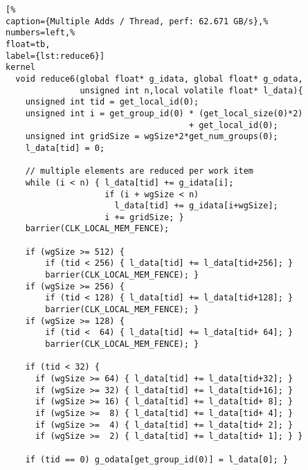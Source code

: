 \begin{lstlisting}[%                                                             
caption={Multiple Adds / Thread, perf: 62.671 GB/s},%
numbers=left,%
float=tb,
label={lst:reduce6}]
kernel
  void reduce6(global float* g_idata, global float* g_odata,
               unsigned int n,local volatile float* l_data){
    unsigned int tid = get_local_id(0);
    unsigned int i = get_group_id(0) * (get_local_size(0)*2)
                                     + get_local_id(0);
    unsigned int gridSize = wgSize*2*get_num_groups(0);
    l_data[tid] = 0;

    // multiple elements are reduced per work item
    while (i < n) { l_data[tid] += g_idata[i];
                    if (i + wgSize < n)
                      l_data[tid] += g_idata[i+wgSize];  
                    i += gridSize; } 
    barrier(CLK_LOCAL_MEM_FENCE);

    if (wgSize >= 512) {
        if (tid < 256) { l_data[tid] += l_data[tid+256]; }
        barrier(CLK_LOCAL_MEM_FENCE); }
    if (wgSize >= 256) {
        if (tid < 128) { l_data[tid] += l_data[tid+128]; }
        barrier(CLK_LOCAL_MEM_FENCE); }
    if (wgSize >= 128) {
        if (tid <  64) { l_data[tid] += l_data[tid+ 64]; }
        barrier(CLK_LOCAL_MEM_FENCE); }
    
    if (tid < 32) {
      if (wgSize >= 64) { l_data[tid] += l_data[tid+32]; }
      if (wgSize >= 32) { l_data[tid] += l_data[tid+16]; }
      if (wgSize >= 16) { l_data[tid] += l_data[tid+ 8]; }
      if (wgSize >=  8) { l_data[tid] += l_data[tid+ 4]; }
      if (wgSize >=  4) { l_data[tid] += l_data[tid+ 2]; }
      if (wgSize >=  2) { l_data[tid] += l_data[tid+ 1]; } }
    
    if (tid == 0) g_odata[get_group_id(0)] = l_data[0]; }
\end{lstlisting}

